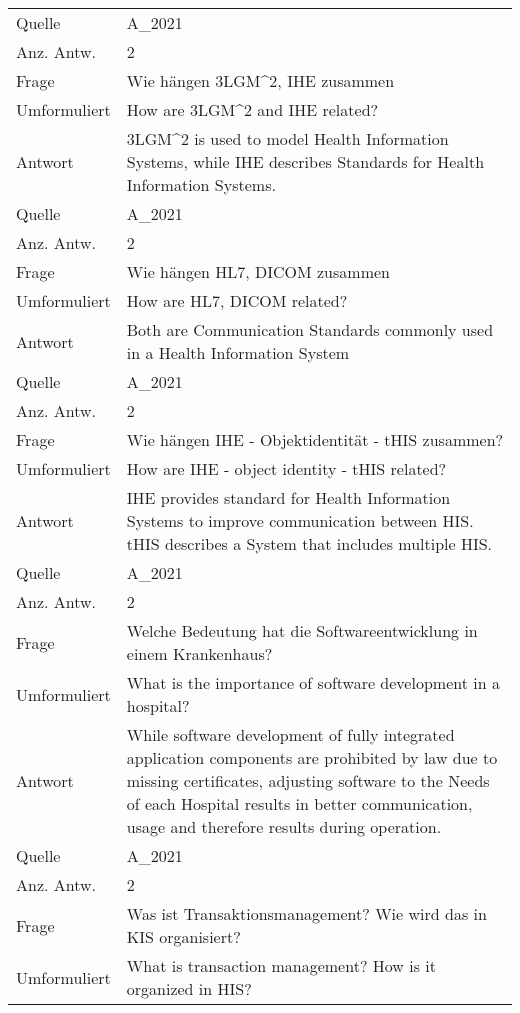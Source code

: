 \begin{landscape}
\begin{longtable}{p{3cm}p{}}
    Quelle & A\_2021 \\
    Anz. Antw. & 2 \\
    \midrule
    Frage & Wie hängen 3LGM\textasciicircum{}2, IHE zusammen \\
    Umformuliert & How are 3LGM\textasciicircum{}2 and IHE related? \\
    Antwort & 3LGM\textasciicircum{}2 is used to model Health Information Systems, while IHE describes Standards for Health Information Systems.\\
    Quelle & A\_2021 \\
    Anz. Antw. & 2 \\
    \midrule
    Frage & Wie hängen HL7, DICOM zusammen \\
    Umformuliert & How are HL7, DICOM related? \\
    Antwort & Both are Communication Standards commonly used in a Health Information System \\
    Quelle & A\_2021 \\
    Anz. Antw. & 2 \\
    \midrule
    Frage & Wie hängen IHE - Objektidentität - tHIS zusammen? \\
    Umformuliert & How are IHE - object identity - tHIS related? \\
    Antwort & IHE provides standard for Health Information Systems to improve communication between HIS.
    tHIS describes a System that includes multiple HIS.\\
    Quelle & A\_2021 \\
    Anz. Antw. & 2 \\
    \midrule
    Frage & Welche Bedeutung hat die Softwareentwicklung in einem Krankenhaus? \\
    Umformuliert & What is the importance of software development in a hospital? \\
    Antwort & While software development of fully integrated application components are prohibited by law due to missing certificates, adjusting software to the Needs of each Hospital results in better communication, usage and therefore results during operation.\\
    Quelle & A\_2021 \\
    Anz. Antw. & 2 \\
    \midrule
    Frage & Was ist Transaktionsmanagement? Wie wird das in KIS organisiert? \\
    Umformuliert & What is transaction management? How is it organized in HIS? \\

\end{longtable}
\end{landscape}
